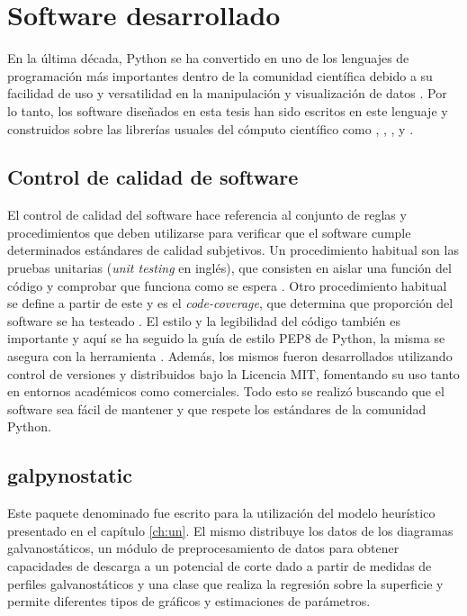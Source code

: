 \chapter{Software desarrollado}\label{a:software}

En la última década, Python se ha convertido en uno de los lenguajes de programación 
más importantes dentro de la comunidad científica debido a su facilidad de uso y 
versatilidad en la manipulación y visualización de datos \cite{millman2011}. 
Por lo tanto, los software diseñados en esta tesis han sido escritos en este
lenguaje y construidos sobre las librerías usuales del cómputo científico como
 \cite{numpy},  \cite{scipy},  \cite{pandas}, 
 \cite{matplotlib} y  \cite{sklearn1, sklearn2}. 


\section{Control de calidad de software}\label{software:control}

El control de calidad del software hace referencia al conjunto de reglas y 
procedimientos que deben utilizarse para verificar que el software cumple 
determinados estándares de calidad subjetivos. Un procedimiento habitual son las 
pruebas unitarias (\textit{unit testing} en inglés), que consisten en aislar una 
función del código y comprobar que funciona como se espera \cite{jazayeri2007}. 
Otro procedimiento habitual se define a partir de este y es el 
\textit{code-coverage}, que determina que proporción del software se ha testeado
\cite{miller1963}. El estilo y la legibilidad del código también es importante
y aquí se ha seguido la guía de estilo PEP8 de Python, la misma se asegura con 
la herramienta . Además, los mismos fueron desarrollados utilizando control 
de versiones  y distribuidos bajo la Licencia MIT, fomentando su uso tanto en 
entornos académicos como comerciales. Todo esto se realizó buscando que el 
software sea fácil de mantener y que respete los estándares de la comunidad Python.


\section{galpynostatic}\label{software:galpynostatic}

Este paquete denominado  fue escrito para la utilización
del modelo heurístico presentado en el capítulo \ref{ch:un}. El mismo distribuye 
los datos de los diagramas galvanostáticos, un módulo de preprocesamiento de datos
para obtener capacidades de descarga a un potencial de corte dado a partir de 
medidas de perfiles galvanostáticos y una clase que realiza la regresión sobre la 
superficie y permite diferentes tipos de gráficos y estimaciones de parámetros.

